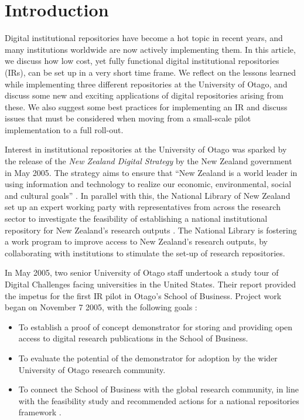 \documentclass[12pt,pdftex,a4paper,titlepage]{article}
\begin{document}
\section{Introduction}

Digital institutional repositories have become a hot topic in recent years, and many institutions worldwide are now actively implementing them. In this article, we discuss how low cost, yet fully functional digital institutional repositories (IRs), can be set up in a very short time frame. We reflect on the lessons learned while implementing three different repositories at the University of Otago, and discuss some new and exciting applications of digital repositories arising from these. We also suggest some best practices for implementing an IR and discuss issues that must be considered when moving from a small-scale pilot implementation to a full roll-out.

Interest in institutional repositories at the University of Otago was sparked by the release of the \emph{New Zealand Digital Strategy} by the New Zealand government in May 2005. The strategy aims to ensure that ``New Zealand is a world leader in using information and technology to realize our economic, environmental, social and cultural goals'' \cite{NZG-2005-digital_strategy}. In parallel with this, the National Library of New Zealand set up an expert working party with representatives from across the research sector to investigate the feasibility of establishing a national institutional repository for New Zealand's research outputs \cite{Rank-J-2005-feasibility}. The National Library is fostering a work program to improve access to New Zealand's research outputs, by collaborating with institutions to stimulate the set-up of research repositories.

In May 2005, two senior University of Otago staff undertook a study tour of Digital Challenges facing universities in the United States. Their report provided the impetus for the first IR pilot in Otago's School of Business. Project work began on November 7 2005, with the following goals \cite{Stan-N-2006-running}:
\begin{itemize}

	\item To establish a proof of concept demonstrator for storing and providing open access to digital research publications in the School of Business.

	\item To evaluate the potential of the demonstrator for adoption by the wider University of Otago research community.

	\item To connect the School of Business with the global research community, in line with the feasibility study and recommended actions for a national repositories framework \cite{Rank-J-2005-feasibility}.

\end{itemize}
\end{document}
